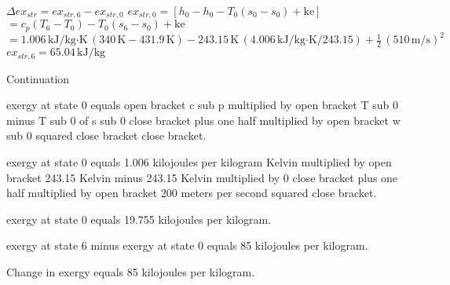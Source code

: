 \( \Delta ex_{str} = ex_{str,6} - ex_{str,0} \)  
\( ex_{str,0} = [h_0 - h_0 - T_0(s_0 - s_0) + \text{ke}] \)  
\( = c_p(T_6 - T_0) - T_0(s_6 - s_0) + \text{ke} \)  
\( = 1.006 \, \text{kJ/kg·K} \, (340 \, \text{K} - 431.9 \, \text{K}) - 243.15 \, \text{K} \, (4.006 \, \text{kJ/kg·K} / 243.15) + \frac{1}{2} \, (510 \, \text{m/s})^2 \)  
\( ex_{str,6} = 65.04 \, \text{kJ/kg} \)

Continuation  

exergy at state 0 equals open bracket c sub p multiplied by open bracket T sub 0 minus T sub 0 of s sub 0 close bracket plus one half multiplied by open bracket w sub 0 squared close bracket close bracket.  

exergy at state 0 equals 1.006 kilojoules per kilogram Kelvin multiplied by open bracket 243.15 Kelvin minus 243.15 Kelvin multiplied by 0 close bracket plus one half multiplied by open bracket 200 meters per second squared close bracket.  

exergy at state 0 equals 19.755 kilojoules per kilogram.  

exergy at state 6 minus exergy at state 0 equals 85 kilojoules per kilogram.  

Change in exergy equals 85 kilojoules per kilogram.